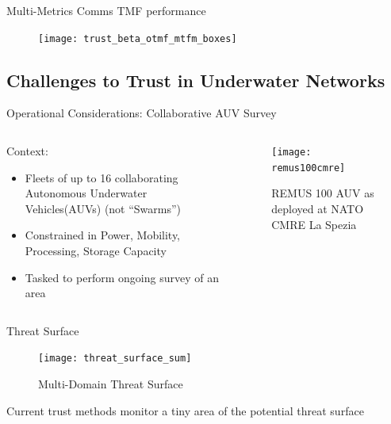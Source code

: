 \documentclass[aspectratio=169]{beamer}
\begin{document}
\begin{frame}{Multi-Metrics Comms TMF performance}
	\begin{figure}
		\centering
		\texttt{[image: trust\_beta\_otmf\_mtfm\_boxes]}
		\label{fig:otmf_beta_comparison_boxes}
	\end{figure}
\end{frame}

\subsection{Challenges to Trust in Underwater Networks}

\begin{frame}{Operational Considerations: Collaborative AUV Survey}
  \begin{columns}
    \begin{column}{0.5\textwidth}
      Context:
      \begin{itemize}
        \item Fleets of up to 16 collaborating Autonomous Underwater Vehicles(AUVs) (not ``Swarms'')
        \item Constrained in Power, Mobility, Processing, Storage Capacity
        \item Tasked to perform ongoing survey of an area
      \end{itemize}

    \end{column}
    \begin{column}{0.5\textwidth}
      \begin{figure}[h]
        \begin{center}
          \texttt{[image: remus100cmre]}
        \end{center}
        \caption{REMUS 100 AUV as deployed at NATO CMRE La Spezia}
        \label{fig:remus100cmre}
      \end{figure}

    \end{column}
  \end{columns}
\end{frame}

\begin{frame}{Threat Surface}
  \begin{figure}[h!]
    \centering
    \texttt{[image: threat\_surface\_sum]}
    \caption[Multi-Domain Threat Surface]{Multi-Domain Threat Surface}
    \label{fig:threat_surface}
  \end{figure}

  \pause
  Current trust methods monitor a \alert{tiny} area of the potential threat surface
\end{frame}
\end{document}
